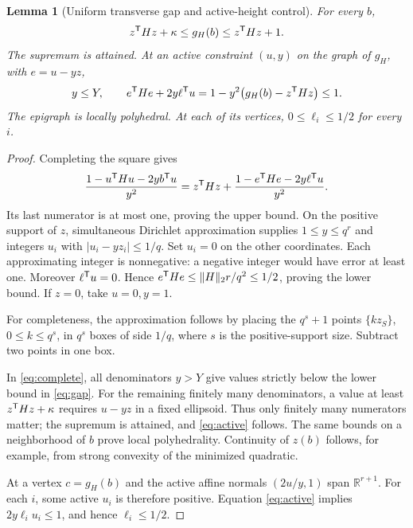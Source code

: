 \documentclass[11pt]{article}
\newtheorem{lemma}[theorem]{Lemma}
\theoremstyle{remark}\newtheorem{remark}[theorem]{Remark}
\newcommand{\R}{\mathbb R}\newcommand{\Q}{\mathbb Q}\newcommand{\Z}{\mathbb Z}
\newcommand{\norm}[1]{\lVert #1\rVert}
\begin{document}
\begin{lemma}[Uniform transverse gap and active-height control]\label{lem:gap}
For every $b$,
\begin{equation}\label{eq:gap}
 z^{\mathsf T} Hz+\kappa\le g_H(b)\le z^{\mathsf T} Hz+1.
\end{equation}
The supremum is attained. At an active constraint $(u,y)$ on the graph of $g_H$, with $e=u-yz$,
\begin{equation}\label{eq:active}
 y\le Y,\qquad e^{\mathsf T} He+2y\ell^{\mathsf T} u
 =1-y^2\bigl(g_H(b)-z^{\mathsf T} Hz\bigr)\le1.
\end{equation}
The epigraph is locally polyhedral. At each of its vertices, $0\le\ell_i\le1/2$ for every $i$.
\end{lemma}
\begin{proof}
Completing the square gives
\begin{equation}\label{eq:complete}
 \frac{1-u^{\mathsf T} Hu-2yb^{\mathsf T} u}{y^2}
 =z^{\mathsf T} Hz+\frac{1-e^{\mathsf T} He-2y\ell^{\mathsf T} u}{y^2}.
\end{equation}
Its last numerator is at most one, proving the upper bound. On the positive support of $z$, simultaneous Dirichlet approximation supplies $1\le y\le q^r$ and integers $u_i$ with $|u_i-yz_i|\le1/q$. Set $u_i=0$ on the other coordinates. Each approximating integer is nonnegative: a negative integer would have error at least one. Moreover $\ell^{\mathsf T} u=0$. Hence $e\trans He\le\norm H_2r/q^2\le1/2$, proving the lower bound. If $z=0$, take $u=0,y=1$.

For completeness, the approximation follows by placing the $q^s+1$ points $\{kz_S\}$, $0\le k\le q^s$, in $q^s$ boxes of side $1/q$, where $s$ is the positive-support size. Subtract two points in one box.

In \eqref{eq:complete}, all denominators $y>Y$ give values strictly below the lower bound in \eqref{eq:gap}. For the remaining finitely many denominators, a value at least $z^{\mathsf T} Hz+\kappa$ requires $u-yz$ in a fixed ellipsoid. Thus only finitely many numerators matter; the supremum is attained, and \eqref{eq:active} follows. The same bounds on a neighborhood of $b$ prove local polyhedrality. Continuity of $z(b)$ follows, for example, from strong convexity of the minimized quadratic.

At a vertex $c=g_H(b)$ and the active affine normals $(2u/y,1)$ span $\R^{r+1}$. For each $i$, some active $u_i$ is therefore positive. Equation \eqref{eq:active} implies $2y\ell_i u_i\le1$, and hence $\ell_i\le1/2$.
\end{proof}
\end{document}
